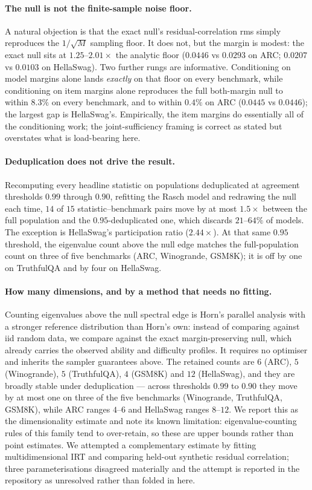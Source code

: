 \documentclass[pdflatex,sn-mathphys-ay]{sn-jnl}
\theoremstyle{thmstyleone}
\theoremstyle{thmstylethree}
\begin{document}
\paragraph{The null is not the finite-sample noise floor.} A natural objection is that the exact
null's residual-correlation rms simply reproduces the $1/\sqrt{M}$ sampling floor. It does not,
but the margin is modest: the exact null sits at $1.25$--$2.01\times$ the analytic floor
($0.0446$ vs $0.0293$ on ARC; $0.0207$ vs $0.0103$ on HellaSwag). Two further rungs are
informative. Conditioning on model margins alone lands \emph{exactly} on that floor on every
benchmark, while conditioning on item margins alone reproduces the full both-margin null to within
$8.3\%$ on every benchmark, and to within $0.4\%$ on ARC ($0.0445$ vs $0.0446$); the largest gap is
HellaSwag's. Empirically, the item margins do essentially all of the
conditioning work; the joint-sufficiency framing is correct as stated but overstates what is
load-bearing here.

\paragraph{Deduplication does not drive the result.} Recomputing every headline statistic on
populations deduplicated at agreement thresholds $0.99$ through $0.90$, refitting the Rasch model
and redrawing the null each time, $14$ of $15$ statistic--benchmark pairs move by at most
$1.5\times$ between the full population and the $0.95$-deduplicated one, which discards
$21$--$64\%$ of models. The exception is HellaSwag's participation ratio ($2.44\times$). At that
same $0.95$ threshold, the eigenvalue count above the null edge matches the full-population count
on three of five benchmarks (ARC, Winogrande, GSM8K); it is off by one on TruthfulQA and by four
on HellaSwag.

\paragraph{How many dimensions, and by a method that needs no fitting.} Counting eigenvalues above
the null spectral edge is Horn's parallel analysis with a stronger reference distribution than
Horn's own: instead of comparing against iid random data, we compare against the exact
margin-preserving null, which already carries the observed ability and difficulty profiles. It
requires no optimiser and inherits the sampler guarantees above. The retained counts are $6$
(ARC), $5$ (Winogrande), $5$ (TruthfulQA), $4$ (GSM8K) and $12$ (HellaSwag), and they are broadly
stable under deduplication --- across thresholds $0.99$ to $0.90$ they move by at most one on
three of the five benchmarks (Winogrande, TruthfulQA, GSM8K), while ARC ranges $4$--$6$ and
HellaSwag ranges $8$--$12$. We report this as the dimensionality estimate and
note its known limitation: eigenvalue-counting rules of this family tend to over-retain, so these
are upper bounds rather than point estimates. We attempted a complementary estimate by fitting
multidimensional IRT and comparing held-out synthetic residual correlation; three
parameterisations disagreed materially and the attempt is reported in the repository as
unresolved rather than folded in here.
\end{document}
